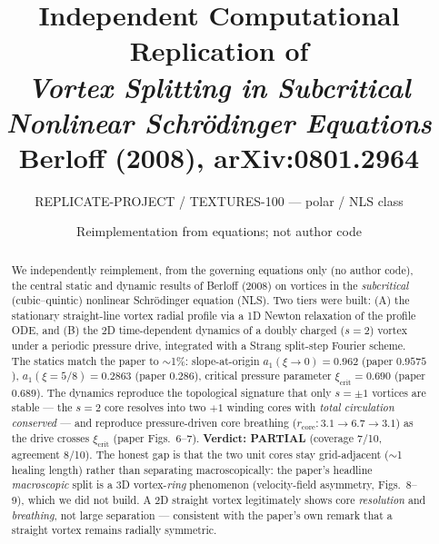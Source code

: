 \documentclass[11pt]{article}
\title{Independent Computational Replication of\\
\emph{Vortex Splitting in Subcritical Nonlinear Schr\"odinger Equations}\\
{\large Berloff (2008), arXiv:0801.2964}}
\author{REPLICATE-PROJECT / TEXTURES-100 --- polar / NLS class}
\date{Reimplementation from equations; not author code}
\begin{document}
\maketitle

\begin{abstract}
We independently reimplement, from the governing equations only (no author code),
the central static and dynamic results of Berloff (2008) on vortices in the
\emph{subcritical} (cubic--quintic) nonlinear Schr\"odinger equation (NLS). Two
tiers were built: (A) the stationary straight-line vortex radial profile via a
1D Newton relaxation of the profile ODE, and (B) the 2D time-dependent dynamics
of a doubly charged ($s=2$) vortex under a periodic pressure drive, integrated
with a Strang split-step Fourier scheme. The statics match the paper to
$\sim$1\%: slope-at-origin $a_1(\xi\!\to\!0)=0.962$ (paper $0.9575$),
$a_1(\xi=5/8)=0.2863$ (paper $0.286$), critical pressure parameter
$\xi_{\mathrm{crit}}=0.690$ (paper $0.689$). The dynamics reproduce the
topological signature that only $s=\pm1$ vortices are stable --- the $s=2$ core
resolves into two $+1$ winding cores with \emph{total circulation conserved} ---
and reproduce pressure-driven core breathing ($r_{\mathrm{core}}:3.1\to6.7\to3.1$)
as the drive crosses $\xi_{\mathrm{crit}}$ (paper Figs.~6--7).
\textbf{Verdict: PARTIAL} (coverage 7/10, agreement 8/10). The honest gap is
that the two unit cores stay grid-adjacent ($\sim$1 healing length) rather than
separating macroscopically: the paper's headline \emph{macroscopic} split is a
3D vortex-\emph{ring} phenomenon (velocity-field asymmetry, Figs.~8--9), which we
did not build. A 2D straight vortex legitimately shows core \emph{resolution} and
\emph{breathing}, not large separation --- consistent with the paper's own remark
that a straight vortex remains radially symmetric.
\end{abstract}
\end{document}
